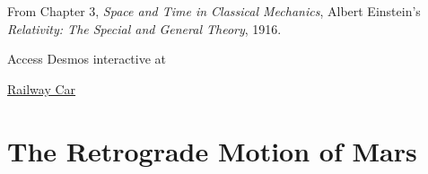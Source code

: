 \documentclass{ximera}
\begin{document}
From  Chapter 3, \emph{Space and Time in Classical Mechanics}, Albert Einstein's \emph{Relativity: The Special and General Theory}, 1916.


\begin{exploration} \label{Edsss4tDE}

Access Desmos interactive at
 
\href{https://www.desmos.com/calculator/vyxsrjx0kp}{Railway Car}

 
\begin{onlineOnly}
    \begin{center}
\end{center}
\end{onlineOnly}


\end{exploration}



\section{The Retrograde Motion of Mars}
\end{document}
